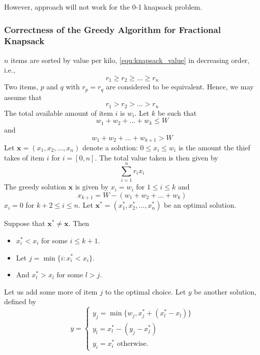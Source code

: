 However, approach will not work for the 0-1 knapsack problem.

\subsubsection{Correctness of the Greedy Algorithm for Fractional Knapsack}

\(n\) items are sorted by value per kilo, \eqref{equ:knapsack_value} in decreasing order, i.e., 
\begin{equation}
    r_1 \geq r_2 \geq ... \geq r_n
\end{equation}
Two items, \(p\) and \(q\) with \(r_p = r_q\) are considered to be equivalent. Hence, we may assume that
\begin{equation}
    r_1 > r_2 > ... > r_n
\end{equation}
The total available amount of item \(i\) is \(w_i\). Let \(k\) be such that
\begin{equation}
    w_1 + w_2 + ... + w_k \leq W
\end{equation}
and
\begin{equation}
    w_1 + w_2 + ... + w_{k+1} > W
\end{equation}
Let \(\mathbf{x} = (x_1, x_2, ..., x_n)\) denote a solution: \(0 \leq x_i \leq w_i\) is the amount the thief takes of item \(i\) for \(i = [0, n]\). The total value taken is then given by
\begin{equation}
    \sum_{i=1}^{n} r_ix_i
\end{equation}
The greedy solution \(\mathbf{x}\) is given by \(x_i = w_i\) for \(1 \leq i \leq k\) and 
\begin{equation}
    x_{k+1} = W - (w_1 + w_2 + ... + w_k)
\end{equation}
\(x_i = 0\) for \(k+2 \leq i \leq n\). Let \(\mathbf{x}^* = (x_1^*, x_2^*, ..., x_n^*)\) be an optimal solution.

Suppose that \(\mathbf{x}^* \neq \mathbf{x}\). Then
\begin{itemize}
    \item \(x_i^* < x_i\) for some \(i \leq k+1\). 
    \item Let \(j = \min\{i:x_i^* < x_i\}\).
    \item And \(x_l^* > x_l\) for some \(l > j\).
\end{itemize}
Let us add some more of item \(j\) to the optimal choice. Let \(y\) be another solution, defined by 
\begin{equation}
    y = \begin{cases}y_j = \min\{w_j, x_j^* + (x_l^* - x_l)\}\\y_l = x_l^* - (y_j - x_j^*)\\y_i=x_i^* \text{   otherwise.}\end{cases}
\end{equation}

